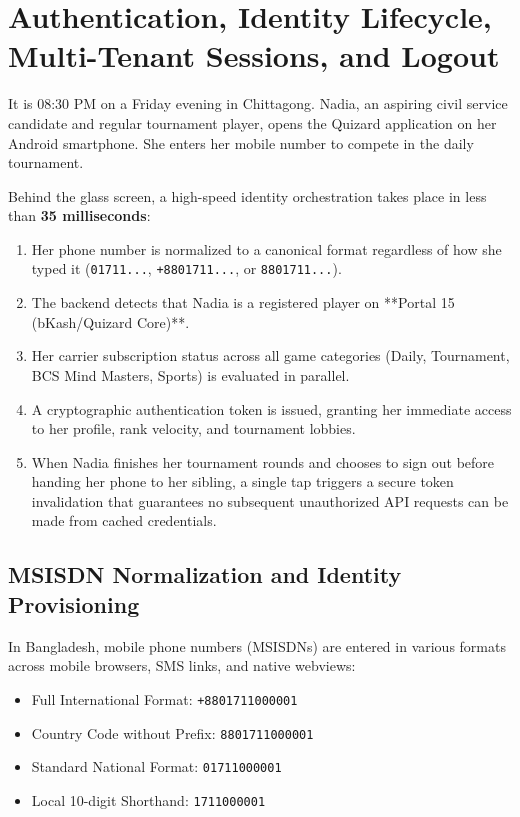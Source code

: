\chapter{Authentication, Identity Lifecycle, Multi-Tenant Sessions, and Logout}

\begin{tcolorbox}[storybox, title={The Story of Nadia's Seamless Login and Secure Sign-Out}]
It is 08:30 PM on a Friday evening in Chittagong. Nadia, an aspiring civil service candidate and regular tournament player, opens the Quizard application on her Android smartphone. She enters her mobile number to compete in the daily tournament.

Behind the glass screen, a high-speed identity orchestration takes place in less than \textbf{35 milliseconds}:
\begin{enumerate}
    \item Her phone number is normalized to a canonical format regardless of how she typed it (\texttt{01711...}, \texttt{+8801711...}, or \texttt{8801711...}).
    \item The backend detects that Nadia is a registered player on **Portal 15 (bKash/Quizard Core)**.
    \item Her carrier subscription status across all game categories (Daily, Tournament, BCS Mind Masters, Sports) is evaluated in parallel.
    \item A cryptographic authentication token is issued, granting her immediate access to her profile, rank velocity, and tournament lobbies.
    \item When Nadia finishes her tournament rounds and chooses to sign out before handing her phone to her sibling, a single tap triggers a secure token invalidation that guarantees no subsequent unauthorized API requests can be made from cached credentials.
\end{enumerate}
\end{tcolorbox}

\section{MSISDN Normalization and Identity Provisioning}
In Bangladesh, mobile phone numbers (MSISDNs) are entered in various formats across mobile browsers, SMS links, and native webviews:
\begin{itemize}
    \item Full International Format: \texttt{+8801711000001}
    \item Country Code without Prefix: \texttt{8801711000001}
    \item Standard National Format: \texttt{01711000001}
    \item Local 10-digit Shorthand: \texttt{1711000001}
\end{itemize}

